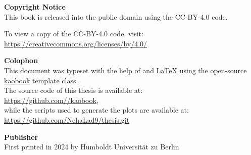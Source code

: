 \documentclass[
	fontsize=10pt, %
	twoside=true, %
	numbers=noenddot,
	secnumdepth=1, %
]{kaobook}
\begin{document}
\begin{titlepage}
\begin{center}
	\end{center}
	\newpage
	
	\vspace*{8cm}
	
	\textbf{Copyright Notice}\\
	This book is released into the public domain using the CC-BY-4.0 code. 
	
	To view a copy of the CC-BY-4.0 code, visit: \\\url{https://creativecommons.org/licenses/by/4.0/}
	
	\medskip
	\textbf{Colophon} \\
	This document was typeset with the help of \href{https://sourceforge.net/projects/koma-script/}{\KOMAScript} and \href{https://www.latex-project.org/}{\LaTeX} using the open-source \href{https://github.com/fmarotta/kaobook/}{kaobook} template class.\\
	
	The source code of this thesis is available at:\\\url{https://github.com//kaobook}, \\while the scripts used to generate the plots are available at: \\\url{https://github.com/NehaLad9/thesis.git}\\
	
	\medskip
	
	\textbf{Publisher} \\
	First printed in 2024 by Humboldt Universität zu Berlin
	
	\newpage
	
	\vspace*{5.0cm}
	
	
\end{titlepage}

\frontmatter %





\cleardoubleoddpage


\end{document}
